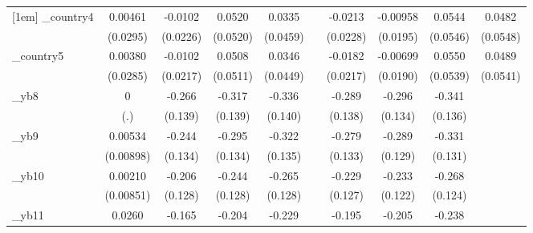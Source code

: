 \begin{table}[htbp]
\begin{tabular}{l*{9}{c}}
[1em]
\_country4   &     0.00461         &     -0.0102         &      0.0520         &      0.0335         &                     &     -0.0213         &    -0.00958         &      0.0544         &      0.0482         \\
            &    (0.0295)         &    (0.0226)         &    (0.0520)         &    (0.0459)         &                     &    (0.0228)         &    (0.0195)         &    (0.0546)         &    (0.0548)         \\
[1em]
\_country5   &     0.00380         &     -0.0102         &      0.0508         &      0.0346         &                     &     -0.0182         &    -0.00699         &      0.0550         &      0.0489         \\
            &    (0.0285)         &    (0.0217)         &    (0.0511)         &    (0.0449)         &                     &    (0.0217)         &    (0.0190)         &    (0.0539)         &    (0.0541)         \\
[1em]
\_yb8        &           0         &      -0.266\sym{*}  &      -0.317\sym{**} &      -0.336\sym{**} &                     &      -0.289\sym{**} &      -0.296\sym{**} &      -0.341\sym{**} &                     \\
            &         (.)         &     (0.139)         &     (0.139)         &     (0.140)         &                     &     (0.138)         &     (0.134)         &     (0.136)         &                     \\
[1em]
\_yb9        &     0.00534         &      -0.244\sym{*}  &      -0.295\sym{**} &      -0.322\sym{**} &                     &      -0.279\sym{**} &      -0.289\sym{**} &      -0.331\sym{**} &                     \\
            &   (0.00898)         &     (0.134)         &     (0.134)         &     (0.135)         &                     &     (0.133)         &     (0.129)         &     (0.131)         &                     \\
[1em]
\_yb10       &     0.00210         &      -0.206         &      -0.244\sym{*}  &      -0.265\sym{**} &                     &      -0.229\sym{*}  &      -0.233\sym{*}  &      -0.268\sym{**} &                     \\
            &   (0.00851)         &     (0.128)         &     (0.128)         &     (0.128)         &                     &     (0.127)         &     (0.122)         &     (0.124)         &                     \\
[1em]
\_yb11       &      0.0260         &      -0.165         &      -0.204         &      -0.229\sym{*}  &                     &      -0.195         &      -0.205\sym{*}  &      -0.238\sym{*}  &                     \\

\end{tabular}
\end{table}
